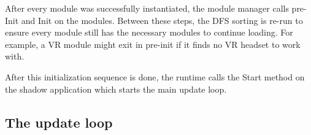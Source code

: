 After every module was successfully instantiated, the module manager calls pre-Init and Init on the modules. Between these steps, the DFS sorting is re-run to ensure every module still has the necessary modules to continue loading. For example, a VR module might exit in pre-init if it finds no VR headset to work with.

After this initialization sequence is done, the runtime calls the Start method on the shadow application which starts the main update loop.

\subsection{The update loop}

